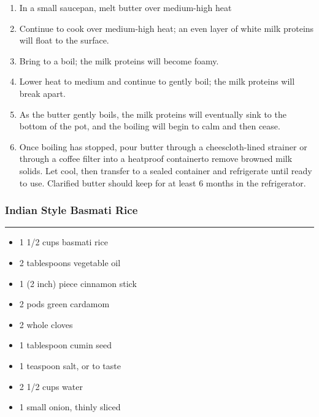\documentclass{article}
\begin{document}
\begin{enumerate}
    \item 
        In a small saucepan, melt butter over medium-high heat
    \item 
        Continue to cook over medium-high heat; an even layer of white milk proteins will float to the surface.
    \item 
        Bring to a boil; the milk proteins will become foamy.
    \item 
        Lower heat to medium and continue to gently boil; the milk proteins will break apart.
    \item 
        As the butter gently boils, the milk proteins will eventually sink to the bottom of the pot, and the boiling will begin to calm and then cease.
    \item 
        Once boiling has stopped, pour butter through a cheescloth-lined strainer or through a coffee filter into a heatproof containerto remove browned milk solids. Let cool, then transfer to a sealed container and refrigerate until ready to use. Clarified butter should keep for at least 6 months in the refrigerator.
\end{enumerate}

\subsubsection{Indian Style Basmati Rice}
\noindent\rule[0.5ex]{\linewidth}{0.5pt}

\begin{framed}
    \begin{itemize}
        \item 1 1/2 cups basmati rice
        \item 2 tablespoons vegetable oil
        \item 1 (2 inch) piece cinnamon stick
        \item 2 pods green cardamom
        \item 2 whole cloves
        \item 1 tablespoon cumin seed
        \item 1 teaspoon salt, or to taste
        \item 2 1/2 cups water
        \item 1 small onion, thinly sliced
    \end{itemize}
\end{framed}
\end{document}
